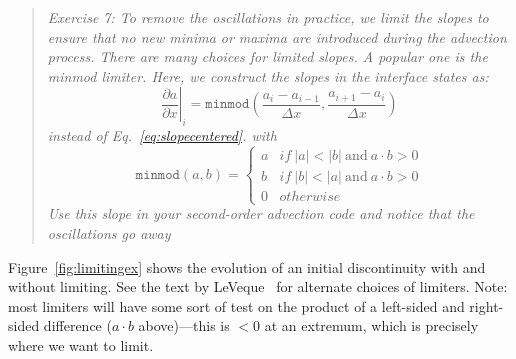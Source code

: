 \documentclass[11pt]{article}
\begin{document}
\begin{quote}
{\em Exercise 7:   To remove the oscillations in
practice, we limit the slopes to ensure that no new minima or maxima are
introduced during the advection process.  There are many choices for
limited slopes.  A popular one is the {\em minmod} limiter.  Here, we
construct the slopes in the interface states as:
\begin{equation}
\left . \frac{\partial a}{\partial x} \right |_i = \mathtt{minmod} \left (
  \frac{a_i - a_{i-1}}{\Delta x}, \frac{a_{i+1} - a_i}{\Delta x} \right )
\end{equation}
instead of Eq.~\ref{eq:slopecentered}.
with 
\begin{equation}
\mathtt{minmod}(a,b) = \left \{ 
    \begin{array}{ll}
    a & \mathit{if~} |a| < |b| \mathrm{~and~} a\cdot b > 0 \\
    b & \mathit{if~} |b| < |a| \mathrm{~and~} a\cdot b > 0 \\
    0 & \mathit{otherwise}
    \end{array}
  \right .
\end{equation}
Use this slope in your second-order advection code and notice that the
oscillations go away }
\end{quote}

Figure~\ref{fig:limitingex} shows the evolution
of an initial discontinuity with and without limiting.  See the text
by LeVeque~\cite{leveque:2002} for alternate choices of
limiters. Note: most limiters will have some sort of test on the product
of a left-sided and right-sided difference ($a\cdot
b$ above)---this is $< 0$ at an extremum, which is precisely where we want to
limit. 
\end{document}
